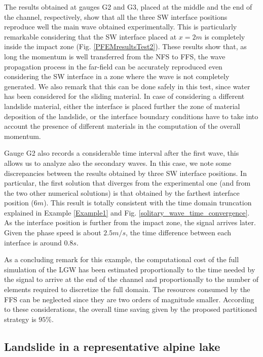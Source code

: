The results obtained at gauges G2 and G3, placed at the middle and the end of the channel, respectively, show that all the three SW interface positions reproduce well the main wave obtained experimentally. This is particularly remarkable considering that the SW interface placed at $x=2m$ is completely inside the impact zone (Fig. \ref{PFEMresultsTest2}). These results show that, as long the momentum is well transferred from the NFS to FFS, the wave propagation process in the far-field can be accurately reproduced even considering the SW interface in a zone where the wave is not completely generated. We also remark that this can be done safely in this test, since water has been considered for the sliding material. In case of considering a different landslide material, either the interface is placed further the zone of material deposition of the landslide, or the interface boundary conditions have to take into account the presence of different materials in the computation of the overall momentum.

Gauge G2 also records a considerable time interval after the first wave, this allows us to analyze also the secondary waves. In this case, we note some discrepancies between the results obtained by three SW interface positions. In particular, the first solution that diverges from the experimental one (and from the two other numerical solutions) is that obtained by the farthest interface position ($6m$). This result is totally consistent with the time domain truncation explained in Example \ref{Example1} and Fig. \ref{solitary_wave_time_convergence}. As the interface position is further from the impact zone, the signal arrives later. Given the phase speed is about $2.5m/s$, the time difference between each interface is around $0.8s$.


As a concluding remark for this example, the computational cost of the full simulation of the LGW has been estimated proportionally to the time needed by the signal to arrive at the end of the channel and proportionally to the number of elements required to discretize the full domain. The resources consumed by the FFS can be neglected since they are two orders of magnitude smaller. According to these considerations, the overall time saving given by the proposed partitioned strategy is $95\%$.




\subsection{Landslide in a representative alpine lake}
\label{Example3}

